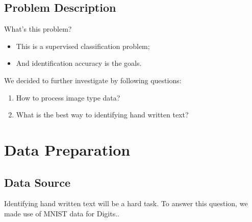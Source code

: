 \documentclass[conference]{IEEEtran}
\begin{document}
\subsection{Problem Description}
What's this problem?
\begin{itemize}
  \item This is a supervised classification problem;
  \item And identification accuracy is the goals.
\end{itemize}
 We decided to further investigate by following questions: 
\begin{enumerate}
  \item How to process image type data?
  \item What is the best way to identifying hand written text?
\end{enumerate}

\section{Data Preparation}
\subsection{Data Source}
Identifying hand written text will be a hard task. To answer this question, we made use of MNIST data for Digits.\cite{lecun-mnisthandwrittendigit-2010}.
\end{document}
